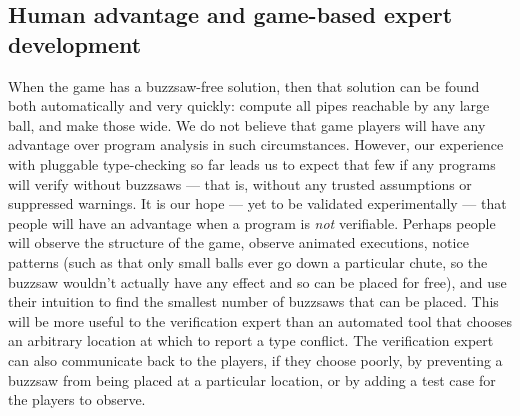 \documentclass{sig-alternate}
\begin{document}
% 
% 


\subsection{Human advantage and game-based expert development}
 
When the game has a buzzsaw-free solution, then that solution can be found
both automatically and very quickly:  compute all pipes reachable by any
large ball, and make those wide.  We do not believe that game players will
have any advantage over program analysis in such circumstances.  However,
our experience with pluggable type-checking so far leads us to expect that
few if any programs will verify without buzzsaws --- that is, without any
trusted assumptions or suppressed warnings.  It is our hope --- yet to be
validated experimentally --- that people will have an advantage when a
program is \emph{not} verifiable.  Perhaps people will observe the
structure of the game, observe animated executions, notice patterns (such
as that only small balls ever go down a particular chute, so the buzzsaw
wouldn't actually have any effect and so can be placed for free), and use
their intuition to find the smallest number of buzzsaws that can be placed.
This will be more useful to the verification expert than an automated tool
that chooses an arbitrary location at which to report a type conflict.
The verification expert can also communicate back to the players, if they
choose poorly, by preventing a buzzsaw from being placed at a particular
location, or by adding a test case for the players to observe.
\end{document}
